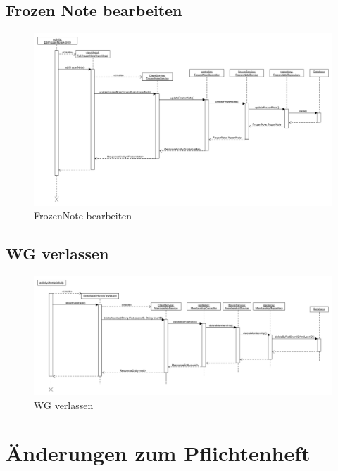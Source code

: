 \documentclass[a4paper]{scrreprt}
\begin{document}
		\section{Frozen Note bearbeiten}
 	\begin{figure}[H]
	       \centering
	       \includegraphics[scale = .35]{Sequenzdiagram_EditFrozenNote.png}
	       \caption{FrozenNote bearbeiten}
	      \end{figure}	
	      
	      	
		
		\section{WG verlassen}
		 \begin{figure}[H]
	       \centering
	       \includegraphics[scale = .35]{SD_WG_verlassen.png}
	       \caption{WG verlassen}
	      \end{figure}
	      	
	      

\chapter{Änderungen zum Pflichtenheft}
	
\end{document}
